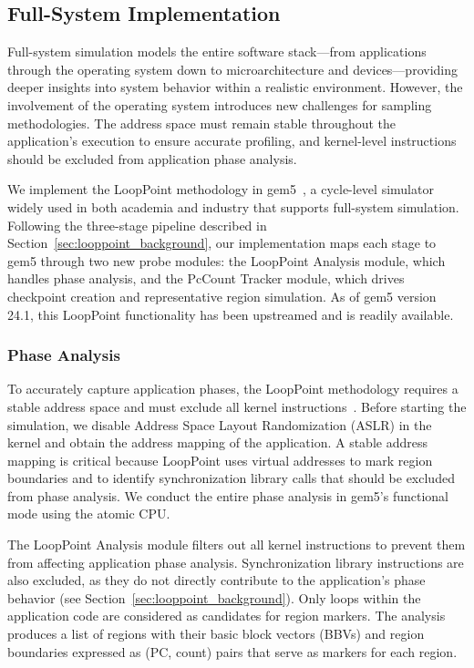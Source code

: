\subsection{Full-System Implementation}\label{sec:looppoint_full_system}

Full-system simulation models the entire software stack---from applications through the operating system down to microarchitecture and devices---providing deeper insights into system behavior within a realistic environment.
However, the involvement of the operating system introduces new challenges for sampling methodologies.
The address space must remain stable throughout the application's execution to ensure accurate profiling, and kernel-level instructions should be excluded from application phase analysis.

We implement the LoopPoint methodology in gem5~\cite{11_gem5,20_gem5}, a cycle-level simulator widely used in both academia and industry that supports full-system simulation.
Following the three-stage pipeline described in Section~\ref{sec:looppoint_background}, our implementation maps each stage to gem5 through two new probe modules: the LoopPoint Analysis module, which handles phase analysis, and the PcCount Tracker module, which drives checkpoint creation and representative region simulation.
As of gem5 version 24.1, this LoopPoint functionality has been upstreamed and is readily available.

\subsubsection{Phase Analysis}

To accurately capture application phases, the LoopPoint methodology requires a stable address space and must exclude all kernel instructions~\cite{simflex}.
Before starting the simulation, we disable Address Space Layout Randomization (ASLR) in the kernel and obtain the address mapping of the application.
A stable address mapping is critical because LoopPoint uses virtual addresses to mark region boundaries and to identify synchronization library calls that should be excluded from phase analysis.
We conduct the entire phase analysis in gem5's functional mode using the atomic CPU.

The LoopPoint Analysis module filters out all kernel instructions to prevent them from affecting application phase analysis.
Synchronization library instructions are also excluded, as they do not directly contribute to the application's phase behavior (see Section~\ref{sec:looppoint_background}).
Only loops within the application code are considered as candidates for region markers.
The analysis produces a list of regions with their basic block vectors (BBVs) and region boundaries expressed as (PC, count) pairs that serve as markers for each region.

